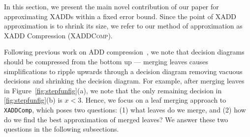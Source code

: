 \label{sec:approx}

In this section, we present the main novel contribution of our paper
for approximating XADDs within a fixed error bound.  Since the point
of XADD approximation is to shrink its size, we refer to our method of
approximation as XADD Compression (\textsc{XADDComp}).

Following previous work on ADD compression~\cite{apricodd}, we note
that decision diagrams should be compressed from the bottom up ---
merging leaves causes simplifications to ripple upwards through a
decision diagram removing vacuous decisions and shrinking the decision
diagram.  For example, after merging leaves in
Figure~\ref{fig:stepfunfig}(a), we note that the only remaining
decision in \ref{fig:stepfunfig}(b) is $x < 3$.  Hence, we focus on a
leaf merging approach to \texttt{XADDComp}, which poses two questions:
(1) what leaves do we merge, and (2) how do we find the best
approximation of merged leaves?  We answer these two questions in the
following subsections.




